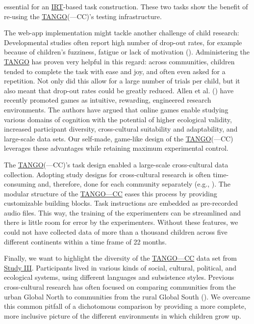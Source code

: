 \documentclass[
]{scrbook}
\begin{document}
essential for an \hyperref[acronyms_IRT]{IRT}-based task construction. These two tasks show the benefit of re-using the \hyperref[acronyms_TANGO]{TANGO}(---CC)'s testing infrastructure.

The web-app implementation might tackle another challenge of child research: Developmental studies often report high number of drop-out rates, for example because of children's fuzziness, fatigue or lack of motivation (). Administering the \hyperref[acronyms_TANGO]{TANGO} has proven very helpful in this regard: across communities, children tended to complete the task with ease and joy, and often even asked for a repetition. Not only did this allow for a large number of trials per child, but it also meant that drop-out rates could be greatly reduced. Allen et al. () have recently promoted games as intuitive, rewarding, engineered research environments. The authors have argued that online games enable studying various domains of cognition with the potential of higher ecological validity, increased participant diversity, cross-cultural suitability and adaptability, and large-scale data sets. Our self-made, game-like design of the \hyperref[acronyms_TANGO]{TANGO}(---CC) leverages these advantages while retaining maximum experimental control.

The \hyperref[acronyms_TANGO]{TANGO}(---CC)'s task design enabled a large-scale cross-cultural data collection. Adopting study designs for cross-cultural research is often time-consuming and, therefore, done for each community separately (e.g., ). The modular structure of the \hyperref[acronyms_TANGOux2014CC]{TANGO---CC} eases this process by providing customizable building blocks. Task instructions are embedded as pre-recorded audio files. This way, the training of the experimenters can be streamlined and there is little room for error by the experimenters. Without these features, we could not have collected data of more than a thousand children across five different continents within a time frame of 22 months.

Finally, we want to highlight the diversity of the \hyperref[acronyms_TANGOux2014CC]{TANGO---CC} data set from \hyperref[studyIII]{Study III}. Participants lived in various kinds of social, cultural, political, and ecological systems, using different languages and subsistence styles. Previous cross-cultural research has often focused on comparing communities from the urban Global North to communities from the rural Global South (). We overcame this common pitfall of a dichotomous comparison by providing a more complete, more inclusive picture of the different environments in which children grow up.
\end{document}
